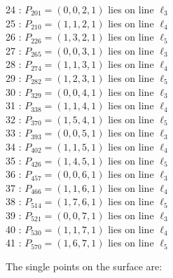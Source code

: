 \documentclass{article}
\begin{document}
{\begin{multicols}{2}
24 : $P_{201}=( 0, 0, 2, 1 )$ lies on line $\ell_{3}$\\
25 : $P_{210}=( 1, 1, 2, 1 )$ lies on line $\ell_{4}$\\
26 : $P_{226}=( 1, 3, 2, 1 )$ lies on line $\ell_{5}$\\
27 : $P_{265}=( 0, 0, 3, 1 )$ lies on line $\ell_{3}$\\
28 : $P_{274}=( 1, 1, 3, 1 )$ lies on line $\ell_{4}$\\
29 : $P_{282}=( 1, 2, 3, 1 )$ lies on line $\ell_{5}$\\
30 : $P_{329}=( 0, 0, 4, 1 )$ lies on line $\ell_{3}$\\
31 : $P_{338}=( 1, 1, 4, 1 )$ lies on line $\ell_{4}$\\
32 : $P_{370}=( 1, 5, 4, 1 )$ lies on line $\ell_{5}$\\
33 : $P_{393}=( 0, 0, 5, 1 )$ lies on line $\ell_{3}$\\
34 : $P_{402}=( 1, 1, 5, 1 )$ lies on line $\ell_{4}$\\
35 : $P_{426}=( 1, 4, 5, 1 )$ lies on line $\ell_{5}$\\
36 : $P_{457}=( 0, 0, 6, 1 )$ lies on line $\ell_{3}$\\
37 : $P_{466}=( 1, 1, 6, 1 )$ lies on line $\ell_{4}$\\
38 : $P_{514}=( 1, 7, 6, 1 )$ lies on line $\ell_{5}$\\
39 : $P_{521}=( 0, 0, 7, 1 )$ lies on line $\ell_{3}$\\
40 : $P_{530}=( 1, 1, 7, 1 )$ lies on line $\ell_{4}$\\
41 : $P_{570}=( 1, 6, 7, 1 )$ lies on line $\ell_{5}$\\
\end{multicols}
The single points on the surface are:\\
}
\end{document}
